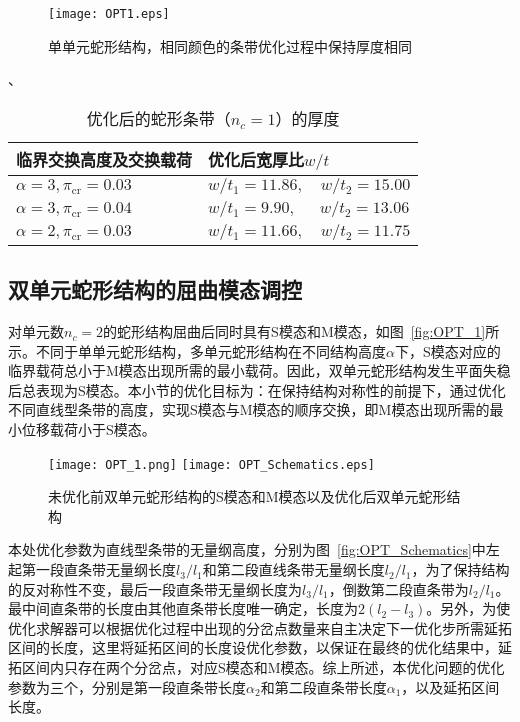 \begin{figure}
	\centering
	\texttt{[image: OPT1.eps]}
	\caption{单单元蛇形结构，相同颜色的条带优化过程中保持厚度相同}
	\label{fig:OPT1}
\end{figure}
、
\begin{table}
	\centering
	\caption{优化后的蛇形条带（$n_c=1$）的厚度}
	\begin{tabular}{ll}
		\toprule
		临界交换高度及交换载荷          & 优化后宽厚比$w/t$   \\
		\midrule
		$\alpha=3,\pi_{\mathrm{cr}}=0.03$   & $w/t_1=11.86,\quad  w/t_2=15.00$ \\
		$\alpha=3,\pi_{\mathrm{cr}}=0.04$   & $w/t_1=9.90,\quad~~ w/t_2=13.06$    \\
		$\alpha=2,\pi_{\mathrm{cr}}=0.03$   & $w/t_1=11.66,\quad w/t_2=11.75$    \\
		\bottomrule
	\end{tabular}
	\label{tab:three-line}
\end{table}
\subsection{双单元蛇形结构的屈曲模态调控}
对单元数$n_c=2$的蛇形结构屈曲后同时具有S模态和M模态，如图~\ref{fig:OPT_1}所示。不同于单单元蛇形结构，多单元蛇形结构在不同结构高度$\alpha$下，S模态对应的临界载荷总小于M模态出现所需的最小载荷。因此，双单元蛇形结构发生平面失稳后总表现为S模态。本小节的优化目标为：在保持结构对称性的前提下，通过优化不同直线型条带的高度，实现S模态与M模态的顺序交换，即M模态出现所需的最小位移载荷小于S模态。
\begin{figure}
	\centering
	{\texttt{[image: OPT\_1.png]}}
	{\texttt{[image: OPT\_Schematics.eps]}}\\
	\caption{未优化前双单元蛇形结构的S模态和M模态以及优化后双单元蛇形结构}
	\label{fig:OPT_Intro}
\end{figure}

本处优化参数为直线型条带的无量纲高度，分别为图~\ref{fig:OPT_Schematics}中左起第一段直条带无量纲长度$l_3/l_1$和第二段直线条带无量纲长度$l_2/l_1$，为了保持结构的反对称性不变，最后一段直条带无量纲长度为$l_3/l_1$，倒数第二段直条带为$l_2/l_1$。最中间直条带的长度由其他直条带长度唯一确定，长度为$2\left(l_2-l_3\right)$。另外，为使优化求解器可以根据优化过程中出现的分岔点数量来自主决定下一优化步所需延拓区间的长度，这里将延拓区间的长度设优化参数，以保证在最终的优化结果中，延拓区间内只存在两个分岔点，对应S模态和M模态。综上所述，本优化问题的优化参数为三个，分别是第一段直条带长度$\alpha_2$和第二段直条带长度$\alpha_1$，以及延拓区间长度。

